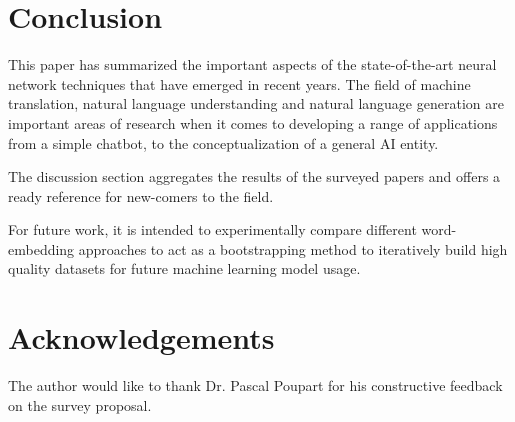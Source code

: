 \documentclass[11pt,a4paper]{article}
\begin{document}


\section{Conclusion} %
\label{sec:conclusion}

  This paper has summarized the important aspects of the state-of-the-art neural network techniques that have emerged in recent years. The field of machine translation, natural language understanding and natural language generation are important areas of research when it comes to developing a range of applications from a simple chatbot, to the conceptualization of a general AI entity.

  The discussion section aggregates the results of the surveyed papers and offers a ready reference for new-comers to the field. 

  For future work, it is intended to experimentally compare different word-embedding approaches to act as a bootstrapping method to iteratively build high quality datasets for future machine learning model usage.



\section{Acknowledgements} %
\label{sec:acknowledgements}

  The author would like to thank Dr. Pascal Poupart for his constructive feedback on the survey proposal.





\end{document}
